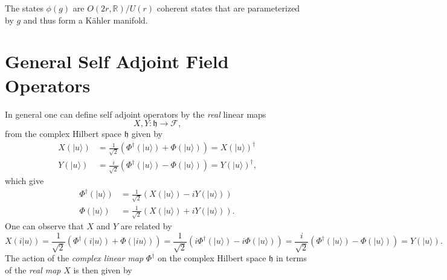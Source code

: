 \documentclass[aps, preprint]{revtex4}
\begin{document}
The states $\phi  \left (g\right )$ are $O (2 r ,\mathbb{R})/U (r)$ coherent states that are parameterized by $g$ and thus form a K{\"a}hler manifold. 

\section{General Self Adjoint Field Operators}
In general one can define self adjoint operators by the \emph{real} linear maps
\begin{equation}X ,Y :\mathfrak{h} \rightarrow \mathcal{F}\text{,}
\end{equation}from the complex Hilbert space $\mathfrak{h}$ given by
\begin{align}X \left (\vert u \rangle \right ) &  =\frac{1}{\sqrt{2}} \left (\Phi ^{ \dag } \left (\vert u \rangle \right ) +\Phi  \left (\vert u \rangle \right )\right ) =X \left (\vert u \rangle \right )^{ \dag } \\
Y \left (\vert u \rangle \right ) &  =\frac{i}{\sqrt{2}} \left (\Phi ^{ \dag } \left (\vert u \rangle \right ) -\Phi  \left (\vert u \rangle \right )\right ) =Y \left (\vert u \rangle \right )^{ \dag }\text{,}\end{align}which give
\begin{align}\Phi ^{ \dag } \left (\vert u \rangle \right ) &  =\frac{1}{\sqrt{2}} \left (X \left (\vert u \rangle \right ) -i Y \left (\vert u \rangle \right )\right ) \\
\Phi  \left (\vert u \rangle \right ) &  =\frac{1}{\sqrt{2}} \left (X \left (\vert u \rangle \right ) +i Y \left (\vert u \rangle \right )\right )\text{.}\end{align}One can observe that $X$ and $Y$ are related by
\begin{equation}X \left (i\vert u \rangle \right ) =\frac{1}{\sqrt{2}} \left (\Phi ^{ \dag } \left (i\vert u \rangle \right ) +\Phi  \left (\vert i u \rangle \right )\right ) =\frac{1}{\sqrt{2}} \left (i \Phi ^{ \dag } \left (\vert u \rangle \right ) -i \Phi  \left (\vert u \rangle \right )\right ) =\frac{i}{\sqrt{2}} \left (\Phi ^{ \dag } \left (\vert u \rangle \right ) -\Phi  \left (\vert u \rangle \right )\right ) =Y \left (\vert u \rangle \right )\text{.}
\end{equation}The action of the \emph{complex linear map} $\Phi ^{ \dag }$ on the complex Hilbert space $\mathfrak{h}$ in terms of the \emph{real map} $X$ is then given by
\end{document}
